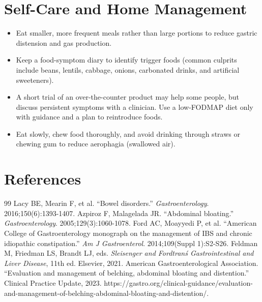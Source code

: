 \section*{Self-Care and Home Management}
\begin{itemize}
 \item Eat smaller, more frequent meals rather than large portions to reduce gastric distension and gas production.
 \item Keep a food-symptom diary to identify trigger foods (common culprits include beans, lentils, cabbage, onions, carbonated drinks, and artificial sweeteners).
 \item A short trial of an over-the-counter product may help some people, but discuss persistent symptoms with a clinician. Use a low-FODMAP diet only with guidance and a plan to reintroduce foods.
 \item Eat slowly, chew food thoroughly, and avoid drinking through straws or chewing gum to reduce aerophagia (swallowed air).
\end{itemize}

\section*{References}
\begin{thebibliography}{99}
 Lacy BE, Mearin F, et al. ``Bowel disorders.'' \textit{Gastroenterology}. 2016;150(6):1393-1407.
 Azpiroz F, Malagelada JR. ``Abdominal bloating.'' \textit{Gastroenterology}. 2005;129(3):1060-1078.
 Ford AC, Moayyedi P, et al. ``American College of Gastroenterology monograph on the management of IBS and chronic idiopathic constipation.'' \textit{Am J Gastroenterol}. 2014;109(Suppl 1):S2-S26.
 Feldman M, Friedman LS, Brandt LJ, eds. \textit{Sleisenger and Fordtran\'s Gastrointestinal and Liver Disease}, 11th ed. Elsevier, 2021.
 American Gastroenterological Association. ``Evaluation and management of belching, abdominal bloating and distention.'' Clinical Practice Update, 2023. https://gastro.org/clinical-guidance/evaluation-and-management-of-belching-abdominal-bloating-and-distention/.
\end{thebibliography}
